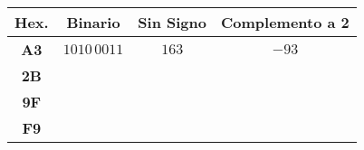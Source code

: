 \documentclass[12pt]{article}
\begin{document}
\begin{enumerate}
        \begin{center}
            \begin{tabular}[t]{|c|c|c|c|}

            \hline

            \textbf{Hex.} & \textbf{Binario} & \textbf{Sin Signo} & \textbf{Complemento a 2}\\

            \hline

            \textbf{A3} & $1010\,0011$ & $163$ & $-93$\\

            \hline

            \textbf{2B} & \hspace{9em}~ &~&~\\

            \hline

            \textbf{9F}&&&\\

            \hline

            \textbf{F9}&&&\\

            \hline

            \end{tabular}

        \end{center}

\end{enumerate}
\end{document}
